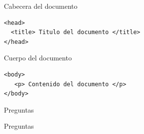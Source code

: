 \documentclass{beamer}
\begin{document}
\begin{frame}[fragile]{Cabecera del documento} %
    \begin{center}
        \begin{lstlisting}
<head>
  <title> Titulo del documento </title>
</head>
        \end{lstlisting}
    \end{center}
\end{frame}

\begin{frame}[fragile]{Cuerpo del documento} %
    \begin{center}
        \begin{lstlisting}
<body>
   <p> Contenido del documento </p>
</body>
        \end{lstlisting}
    \end{center}
\end{frame}


\begin{frame}{Preguntas} %
    \begin{center}
        Preguntas
    \end{center}
\end{frame}
\end{document}
